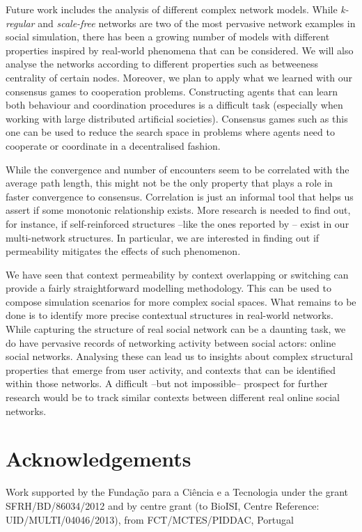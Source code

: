 \documentclass[preprint,number]{elsarticle}
\begin{document}
      Future work includes the analysis of different complex network models. While
      \textit{k-regular} and \textit{scale-free} networks are two of the most pervasive network
      examples in social simulation, there has been a growing number of models with different
      properties inspired by real-world phenomena that can be considered. We will also analyse the
      networks according to different properties such as betweeness centrality of certain
      nodes. Moreover, we plan to apply what we learned with our consensus games to cooperation
      problems. Constructing agents that can learn both behaviour and coordination procedures is a
      difficult task (especially when working with large distributed artificial
      societies). Consensus games such as this one can be used to reduce the search space in
      problems where agents need to cooperate or coordinate in a decentralised fashion.

      While the convergence and number of encounters seem to be correlated with the average path
      length, this might not be the only property that plays a role in faster convergence to
      consensus. Correlation is just an informal tool that helps us assert if some monotonic
      relationship exists. More research is needed to find out, for instance, if self-reinforced
      structures --like the ones reported by \cite{Villatoro2013}-- exist in our multi-network
      structures. In particular, we are interested in finding out if permeability mitigates the
      effects of such phenomenon.

      We have seen that context permeability by context overlapping or switching can provide a
      fairly straightforward modelling methodology. This can be used to compose simulation scenarios
      for more complex social spaces. What remains to be done is to identify more precise contextual
      structures in real-world networks. While capturing the structure of real social network can be
      a daunting task, we do have pervasive records of networking activity between social actors:
      online social networks. Analysing these can lead us to insights about complex structural
      properties that emerge from user activity, and contexts that can be identified within those
      networks. A difficult --but not impossible-- prospect for further research would be to track
      similar contexts between different real online social networks.

      \section*{Acknowledgements}
      \noindent Work supported by the Funda\c{c}\~ao para a Ci\^encia e a Tecnologia under the grant
      SFRH/BD/86034/2012 and by centre grant (to BioISI, Centre Reference:
      UID/MULTI/04046/2013), from FCT/MCTES/PIDDAC, Portugal

      \newpage
      \begin{appendices}
	
      \end{appendices}


       
      
\end{document}

